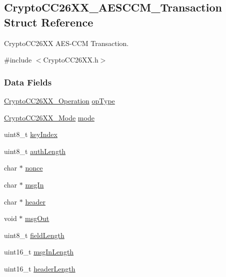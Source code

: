 \subsection{Crypto\-C\-C26\-X\-X\-\_\-\-A\-E\-S\-C\-C\-M\-\_\-\-Transaction Struct Reference}
\label{struct_crypto_c_c26_x_x___a_e_s_c_c_m___transaction}


Crypto\-C\-C26\-X\-X A\-E\-S-\/\-C\-C\-M Transaction.  




{\ttfamily \#include $<$Crypto\-C\-C26\-X\-X.\-h$>$}

\subsubsection*{Data Fields}
\begin{DoxyCompactItemize}
\item 
\hyperlink{_crypto_c_c26_x_x_8h_a28465385e5b45efecc00f2015605f970}{Crypto\-C\-C26\-X\-X\-\_\-\-Operation} \hyperlink{struct_crypto_c_c26_x_x___a_e_s_c_c_m___transaction_a290d9a7869443690836e17e2540fc369}{op\-Type}
\item 
\hyperlink{_crypto_c_c26_x_x_8h_abf86c8ac428559f00fed3299d439e2cd}{Crypto\-C\-C26\-X\-X\-\_\-\-Mode} \hyperlink{struct_crypto_c_c26_x_x___a_e_s_c_c_m___transaction_a47c6078be481486d0dda9a9ab2685d0c}{mode}
\item 
uint8\-\_\-t \hyperlink{struct_crypto_c_c26_x_x___a_e_s_c_c_m___transaction_af0eb856eb89478eef0d83a61e52ad435}{key\-Index}
\item 
uint8\-\_\-t \hyperlink{struct_crypto_c_c26_x_x___a_e_s_c_c_m___transaction_ae543053e1c5906db60e8566764e74b22}{auth\-Length}
\item 
char $\ast$ \hyperlink{struct_crypto_c_c26_x_x___a_e_s_c_c_m___transaction_afad21bc3309b0689f288a8ee27e7a166}{nonce}
\item 
char $\ast$ \hyperlink{struct_crypto_c_c26_x_x___a_e_s_c_c_m___transaction_af14be4d0036174b871b733437fd38361}{msg\-In}
\item 
char $\ast$ \hyperlink{struct_crypto_c_c26_x_x___a_e_s_c_c_m___transaction_ab0fd5775305de978e833c66bc7e29c23}{header}
\item 
void $\ast$ \hyperlink{struct_crypto_c_c26_x_x___a_e_s_c_c_m___transaction_a75508e70a56c297c0bc4351cd586bfdc}{msg\-Out}
\item 
uint8\-\_\-t \hyperlink{struct_crypto_c_c26_x_x___a_e_s_c_c_m___transaction_a8d848bfae83f3b16e8d3a7e83a1c5694}{field\-Length}
\item 
uint16\-\_\-t \hyperlink{struct_crypto_c_c26_x_x___a_e_s_c_c_m___transaction_aa29e2771fcf7967303c7a761e23630fc}{msg\-In\-Length}
\item 
uint16\-\_\-t \hyperlink{struct_crypto_c_c26_x_x___a_e_s_c_c_m___transaction_a28e4d04c356e342908588e19011a0e5d}{header\-Length}
\end{DoxyCompactItemize}


